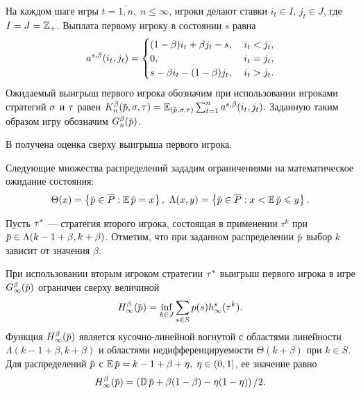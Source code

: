 На каждом шаге игры $t = \overline{1,n}, \; n \leqslant \infty$, игроки делают ставки $i_t \in I, \, j_t \in J$, где $I = J = \mathbb{Z}_+$.
Выплата первому игроку в состоянии $s$ равна
\begin{equation*}
  \as(i_t, j_t) =
  \begin{cases}
    (1-\beta) i_t + \beta j_t - s, &\; i_t < j_t, \\
    0, &\; i_t = j_t, \\
    s - \beta i_t - (1-\beta)j_t, &\; i_t > j_t.
  \end{cases}
\end{equation*}
Ожидаемый выигрыш первого игрока обозначим при использовании игроками стратегий $\sigma$ и $\tau$ равен
$
  \K{n}(\p, \sigmar, \taur) =
  \E_{(\p, \sigmar, \taur)} \sum_{t=1}^n \as(i_t, j_t).
$
Заданную таким образом игру обозначим $\theG{n}(\p)$.

В  получена оценка сверху выигрыша первого игрока.

Следующие множества распределений зададим ограничениями на математическое ожидание состояния:
\begin{gather*}
  \Theta(x) = \left\{ \p \in \MM: \E \p = x \right\},\
  \Lambda(x, y) = \left\{ \p \in \MM: x < \E \p \leqslant y \right\}.
\end{gather*}

Пусть $\tau^*$ --- стратегия второго игрока, состоящая в применении $\tau^k$ при $\p \in \Lambda(k-1+\beta,k+\beta)$.
Отметим, что при заданном распределении $\p$ выбор $k$ зависит от значения $\beta$.

\begin{theorem}
  \label{ch2:upper-bound:theorem}
  При использовании вторым игроком стратегии $\tau^*$ выигрыш первого игрока в игре
  $\theG{\infty}(\p)$ ограничен сверху величиной
  \begin{equation*}
    \H{\infty}(\p) = \inf_{k \in J} \sum_{s \in S} \pc{s}  h^s_\infty(\taur^k).
  \end{equation*}
  Функция $\H{\infty}(\p)$ является кусочно-линейной вогнутой с областями линейности $\Lambda(k - 1 + \beta, k + \beta)$ и областями недифференцируемости $\Theta(k+\beta)$ при $k \in S$.
  Для распределений $\p$ с $\E \p = k - 1 + \beta + \eta, \; \eta \in (0, 1]$, ее значение равно
  \begin{equation}
    \label{ch2:upper-bound:eq:H(p)}
    \H{\infty}(\p) = \left( \D \p + \beta(1-\beta) - \eta(1-\eta) \right)/2.
  \end{equation}
\end{theorem}

